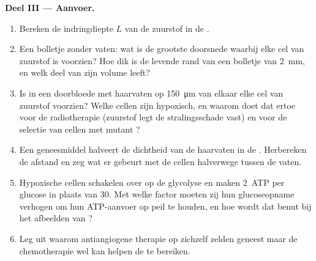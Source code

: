 \begin{problem}
\medskip
\noindent\textbf{Deel III --- Aanvoer.}
\begin{enumerate}[resume]
  \item Bereken de indringdiepte $L$ van de zuurstof in de .
  \item Een bolletje zonder vaten: wat is de grootste doorsnede waarbij
        elke cel van zuurstof is voorzien? Hoe dik is de levende rand
        van een bolletje van \qty{2}{mm}, en welk deel van zijn volume
        leeft?
  \item Is in een doorbloede  met haarvaten op \qty{150}{\micro m}
        van elkaar elke cel van zuurstof voorzien? Welke cellen zijn
        hypoxisch, en waarom doet dat ertoe voor de radiotherapie
        (zuurstof legt de stralingsschade vast) en voor de selectie van
        cellen met mutant ?
  \item Een geneesmiddel halveert de dichtheid van de haarvaten in de
        . Herbereken de afstand en zeg wat er gebeurt met de
        cellen halverwege tussen de vaten.
  \item Hypoxische cellen schakelen over op de glycolyse en maken
        \qty{2}{ATP} per glucose in plaats van $30$. Met welke factor
        moeten zij hun glucoseopname verhogen om hun ATP-aanvoer op
        peil te houden, en hoe wordt dat benut bij het afbeelden van
        ?
  \item Leg uit waarom antiangiogene therapie op zichzelf zelden
        geneest maar de chemotherapie wel kan helpen de  te
        bereiken.
\end{enumerate}


\end{problem}
